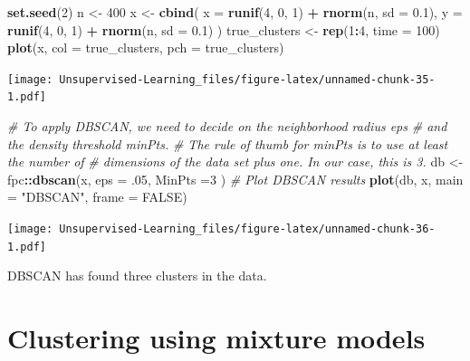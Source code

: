\documentclass[
]{book}
\newenvironment{Shaded}{\begin{snugshade}}{\end{snugshade}}
\newcommand{\CommentTok}[1]{\textcolor[rgb]{0.56,0.35,0.01}{\textit{#1}}}
\newcommand{\DataTypeTok}[1]{\textcolor[rgb]{0.13,0.29,0.53}{#1}}
\newcommand{\DecValTok}[1]{\textcolor[rgb]{0.00,0.00,0.81}{#1}}
\newcommand{\FloatTok}[1]{\textcolor[rgb]{0.00,0.00,0.81}{#1}}
\newcommand{\KeywordTok}[1]{\textcolor[rgb]{0.13,0.29,0.53}{\textbf{#1}}}
\newcommand{\NormalTok}[1]{#1}
\newcommand{\OperatorTok}[1]{\textcolor[rgb]{0.81,0.36,0.00}{\textbf{#1}}}
\newcommand{\OtherTok}[1]{\textcolor[rgb]{0.56,0.35,0.01}{#1}}
\newcommand{\StringTok}[1]{\textcolor[rgb]{0.31,0.60,0.02}{#1}}
\begin{document}
\begin{Shaded}
\begin{Highlighting}[]
\KeywordTok{set.seed}\NormalTok{(}\DecValTok{2}\NormalTok{)}
\NormalTok{n <-}\StringTok{ }\DecValTok{400}
\NormalTok{x <-}\StringTok{ }\KeywordTok{cbind}\NormalTok{(}
\DataTypeTok{x =} \KeywordTok{runif}\NormalTok{(}\DecValTok{4}\NormalTok{, }\DecValTok{0}\NormalTok{, }\DecValTok{1}\NormalTok{) }\OperatorTok{+}\StringTok{ }\KeywordTok{rnorm}\NormalTok{(n, }\DataTypeTok{sd =} \FloatTok{0.1}\NormalTok{),}
\DataTypeTok{y =} \KeywordTok{runif}\NormalTok{(}\DecValTok{4}\NormalTok{, }\DecValTok{0}\NormalTok{, }\DecValTok{1}\NormalTok{) }\OperatorTok{+}\StringTok{ }\KeywordTok{rnorm}\NormalTok{(n, }\DataTypeTok{sd =} \FloatTok{0.1}\NormalTok{)}
\NormalTok{)}
\NormalTok{true_clusters <-}\StringTok{ }\KeywordTok{rep}\NormalTok{(}\DecValTok{1}\OperatorTok{:}\DecValTok{4}\NormalTok{, }\DataTypeTok{time =} \DecValTok{100}\NormalTok{)}
\KeywordTok{plot}\NormalTok{(x, }\DataTypeTok{col =}\NormalTok{ true_clusters, }\DataTypeTok{pch =}\NormalTok{ true_clusters)}
\end{Highlighting}
\end{Shaded}

\texttt{[image: Unsupervised-Learning\_files/figure-latex/unnamed-chunk-35-1.pdf]}

\begin{Shaded}
\begin{Highlighting}[]
\CommentTok{# To apply DBSCAN, we need to decide on the neighborhood radius eps}
\CommentTok{# and the density threshold minPts.}
\CommentTok{# The rule of thumb for minPts is to use at least the number of}
\CommentTok{# dimensions of the data set plus one. In our case, this is 3.}
\NormalTok{db <-}\StringTok{ }\NormalTok{fpc}\OperatorTok{::}\KeywordTok{dbscan}\NormalTok{(x, }\DataTypeTok{eps =} \FloatTok{.05}\NormalTok{, }\DataTypeTok{MinPts =}\DecValTok{3}\NormalTok{ )}
\CommentTok{# Plot DBSCAN results}
\KeywordTok{plot}\NormalTok{(db, x, }\DataTypeTok{main =} \StringTok{"DBSCAN"}\NormalTok{, }\DataTypeTok{frame =} \OtherTok{FALSE}\NormalTok{)}
\end{Highlighting}
\end{Shaded}

\texttt{[image: Unsupervised-Learning\_files/figure-latex/unnamed-chunk-36-1.pdf]}

DBSCAN has found three clusters in the data.

\hypertarget{clustering-using-mixture-models}{%
\section{Clustering using mixture models}\label{clustering-using-mixture-models}}
\end{document}
